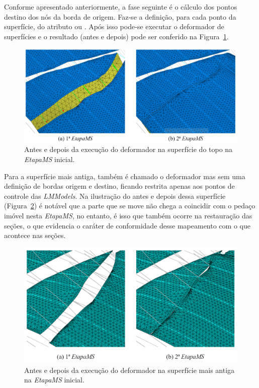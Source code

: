 Conforme apresentado anteriormente, a fase seguinte é o cálculo dos pontos destino dos nós da borda de origem. Faz-se a definição, para cada ponto da superfície, do atributo  ou . Após isso pode-se executar o deformador de superfícies e o resultado (antes e depois) pode ser conferido na Figura~\ref{fig-example-2-7}.

\begin{figure} [H]
  \begin{center}
    \includegraphics[width=\textwidth]{images/fig-example-2-7}
    \caption{Antes e depois da execução do deformador na superfície do topo na \textit{EtapaMS} inicial.}\label{fig-example-2-7}
  \end{center}
\end{figure}

Para a superfície mais antiga, também é chamado o deformador mas sem uma definição de bordas origem e destino, ficando restrita apenas aos pontos de controle das \textit{LMModels}. Na ilustração do antes e depois dessa superfície (Figura~\ref{fig-example-2-8}) é notável que a parte que se move não chega a coincidir com o pedaço imóvel nesta \textit{EtapaMS}, no entanto, é isso que também ocorre na restauração das seções, o que evidencia o caráter de conformidade desse mapeamento com o que acontece nas seções.

\begin{figure} [H]
  \begin{center}
    \includegraphics[width=340pt]{images/fig-example-2-8}
    \caption{Antes e depois da execução do deformador na superfície mais antiga na \textit{EtapaMS} inicial.}\label{fig-example-2-8}
  \end{center}
\end{figure}

